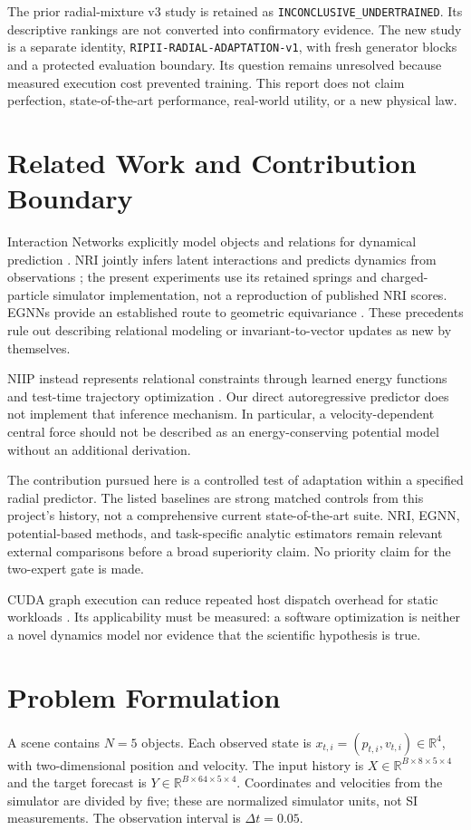 \documentclass[10pt]{article}
\begin{document}
The prior radial-mixture v3 study is retained as \texttt{INCONCLUSIVE\_UNDERTRAINED}. Its descriptive rankings are not converted into confirmatory evidence. The new study is a separate identity, \texttt{RIPII-RADIAL-ADAPTATION-v1}, with fresh generator blocks and a protected evaluation boundary. Its question remains unresolved because measured execution cost prevented training. This report does not claim perfection, state-of-the-art performance, real-world utility, or a new physical law.

\section{Related Work and Contribution Boundary}
Interaction Networks explicitly model objects and relations for dynamical prediction \citep{battaglia2016}. NRI jointly infers latent interactions and predicts dynamics from observations \citep{kipf2018}; the present experiments use its retained springs and charged-particle simulator implementation, not a reproduction of published NRI scores. EGNNs provide an established route to geometric equivariance \citep{satorras2021}. These precedents rule out describing relational modeling or invariant-to-vector updates as new by themselves.

NIIP instead represents relational constraints through learned energy functions and test-time trajectory optimization \citep{comas2023}. Our direct autoregressive predictor does not implement that inference mechanism. In particular, a velocity-dependent central force should not be described as an energy-conserving potential model without an additional derivation.

The contribution pursued here is a controlled test of adaptation within a specified radial predictor. The listed baselines are strong matched controls from this project's history, not a comprehensive current state-of-the-art suite. NRI, EGNN, potential-based methods, and task-specific analytic estimators remain relevant external comparisons before a broad superiority claim. No priority claim for the two-expert gate is made.

CUDA graph execution can reduce repeated host dispatch overhead for static workloads \citep{cuda2021}. Its applicability must be measured: a software optimization is neither a novel dynamics model nor evidence that the scientific hypothesis is true.

\section{Problem Formulation}
A scene contains $N=5$ objects. Each observed state is
$x_{t,i}=(p_{t,i},v_{t,i})\in\mathbb{R}^{4}$, with two-dimensional position and velocity. The input history is
$X\in\mathbb{R}^{B\times 8\times5\times4}$ and the target forecast is
$Y\in\mathbb{R}^{B\times64\times5\times4}$. Coordinates and velocities from the simulator are divided by five; these are normalized simulator units, not SI measurements. The observation interval is $\Delta t=0.05$.
\end{document}
